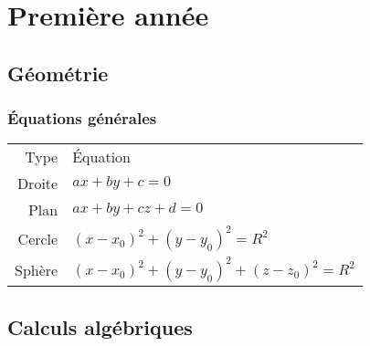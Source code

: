 \documentclass[11pt,a4paper,fleqn,pdftex]{report}
\begin{document}
\part{Première année}
\chapter{Géométrie} %
\label{cha:geometrie}
\section{Équations générales} %
\label{sec:equations_generales}
\begin{tabular}{r | l}
     Type       & Équation \\
     Droite     & $ax + by +c = 0$ \\
     Plan       & $ax + by +cz +d = 0$ \\
     Cercle     & $(x-x_0)^2 + (y-y_0)^2 = R^2$ \\
     Sphère     & $(x-x_0)^2 + (y-y_0)^2  + (z-z_0)^2 = R^2$
\end{tabular}
\chapter{Calculs algébriques} %
\label{cha:calculs_algebriques}
\end{document}
